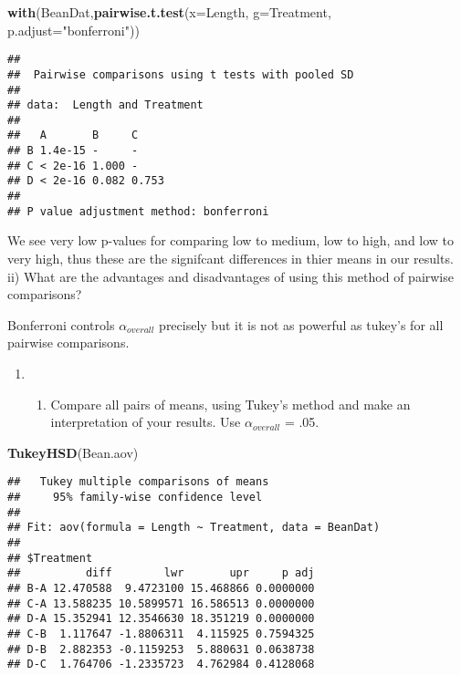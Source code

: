 \documentclass[]{article}
\newenvironment{Shaded}{\begin{snugshade}}{\end{snugshade}}
\newcommand{\KeywordTok}[1]{\textcolor[rgb]{0.13,0.29,0.53}{\textbf{#1}}}
\newcommand{\DataTypeTok}[1]{\textcolor[rgb]{0.13,0.29,0.53}{#1}}
\newcommand{\StringTok}[1]{\textcolor[rgb]{0.31,0.60,0.02}{#1}}
\newcommand{\NormalTok}[1]{#1}
\providecommand{\tightlist}{%
  \setlength{\itemsep}{0pt}\setlength{\parskip}{0pt}}
\begin{document}
\begin{Shaded}
\begin{Highlighting}[]
\KeywordTok{with}\NormalTok{(BeanDat,}\KeywordTok{pairwise.t.test}\NormalTok{(}\DataTypeTok{x=}\NormalTok{Length, }\DataTypeTok{g=}\NormalTok{Treatment, }\DataTypeTok{p.adjust=}\StringTok{"bonferroni"}\NormalTok{))}
\end{Highlighting}
\end{Shaded}

\begin{verbatim}
## 
##  Pairwise comparisons using t tests with pooled SD 
## 
## data:  Length and Treatment 
## 
##   A       B     C    
## B 1.4e-15 -     -    
## C < 2e-16 1.000 -    
## D < 2e-16 0.082 0.753
## 
## P value adjustment method: bonferroni
\end{verbatim}

We see very low p-values for comparing low to medium, low to high, and
low to very high, thus these are the signifcant differences in thier
means in our results. ii) What are the advantages and disadvantages of
using this method of pairwise comparisons?

Bonferroni controls \(\alpha_{overall}\) precisely but it is not as
powerful as tukey's for all pairwise comparisons.

\begin{enumerate}
\def\labelenumi{\Alph{enumi})}
\setcounter{enumi}{4}
\item
  \begin{enumerate}
  \def\labelenumii{\roman{enumii})}
  \tightlist
  \item
    Compare all pairs of means, using Tukey's method and make an
    interpretation of your results. Use \(\alpha_{overall}\) = .05.
  \end{enumerate}
\end{enumerate}

\begin{Shaded}
\begin{Highlighting}[]
\KeywordTok{TukeyHSD}\NormalTok{(Bean.aov)}
\end{Highlighting}
\end{Shaded}

\begin{verbatim}
##   Tukey multiple comparisons of means
##     95% family-wise confidence level
## 
## Fit: aov(formula = Length ~ Treatment, data = BeanDat)
## 
## $Treatment
##          diff        lwr       upr     p adj
## B-A 12.470588  9.4723100 15.468866 0.0000000
## C-A 13.588235 10.5899571 16.586513 0.0000000
## D-A 15.352941 12.3546630 18.351219 0.0000000
## C-B  1.117647 -1.8806311  4.115925 0.7594325
## D-B  2.882353 -0.1159253  5.880631 0.0638738
## D-C  1.764706 -1.2335723  4.762984 0.4128068
\end{verbatim}
\end{document}
